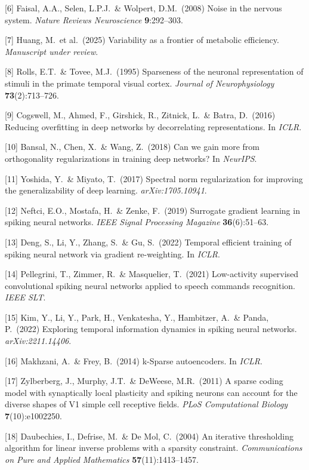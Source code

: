 \documentclass{article}
\begin{document}
[6] Faisal, A.A., Selen, L.P.J.\ \& Wolpert, D.M.\ (2008) Noise in the nervous system. {\it Nature Reviews Neuroscience} {\bf 9}:292--303.

[7] Huang, M.\ et al.\ (2025) Variability as a frontier of metabolic efficiency. {\it Manuscript under review}.

[8] Rolls, E.T.\ \& Tovee, M.J.\ (1995) Sparseness of the neuronal representation of stimuli in the primate temporal visual cortex. {\it Journal of Neurophysiology} {\bf 73}(2):713--726.

[9] Cogswell, M., Ahmed, F., Girshick, R., Zitnick, L.\ \& Batra, D.\ (2016) Reducing overfitting in deep networks by decorrelating representations. In {\it ICLR}.

[10] Bansal, N., Chen, X.\ \& Wang, Z.\ (2018) Can we gain more from orthogonality regularizations in training deep networks? In {\it NeurIPS}.

[11] Yoshida, Y.\ \& Miyato, T.\ (2017) Spectral norm regularization for improving the generalizability of deep learning. {\it arXiv:1705.10941}.

[12] Neftci, E.O., Mostafa, H.\ \& Zenke, F.\ (2019) Surrogate gradient learning in spiking neural networks. {\it IEEE Signal Processing Magazine} {\bf 36}(6):51--63.

[13] Deng, S., Li, Y., Zhang, S.\ \& Gu, S.\ (2022) Temporal efficient training of spiking neural network via gradient re-weighting. In {\it ICLR}.

[14] Pellegrini, T., Zimmer, R.\ \& Masquelier, T.\ (2021) Low-activity supervised convolutional spiking neural networks applied to speech commands recognition. {\it IEEE SLT}.

[15] Kim, Y., Li, Y., Park, H., Venkatesha, Y., Hambitzer, A.\ \& Panda, P.\ (2022) Exploring temporal information dynamics in spiking neural networks. {\it arXiv:2211.14406}.

[16] Makhzani, A.\ \& Frey, B.\ (2014) k-Sparse autoencoders. In {\it ICLR}.

[17] Zylberberg, J., Murphy, J.T.\ \& DeWeese, M.R.\ (2011) A sparse coding model with synaptically local plasticity and spiking neurons can account for the diverse shapes of V1 simple cell receptive fields. {\it PLoS Computational Biology} {\bf 7}(10):e1002250.

[18] Daubechies, I., Defrise, M.\ \& De Mol, C.\ (2004) An iterative thresholding algorithm for linear inverse problems with a sparsity constraint. {\it Communications on Pure and Applied Mathematics} {\bf 57}(11):1413--1457.
\end{document}
